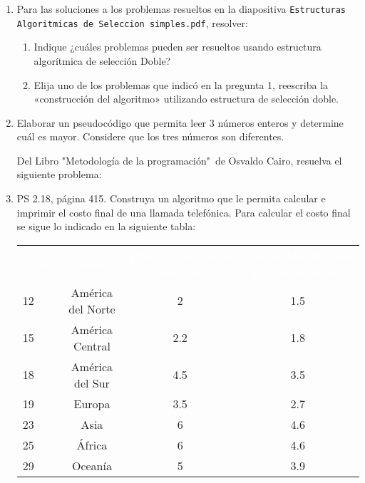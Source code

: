 \documentclass[spanish,11pt,twoside]{article}
\newcommand{\head}[1]{ %
	\textcolor{white}{\textbf{#1}}}
\renewcommand{\arraystretch}{1.5} %
\begin{document}
\begin{enumerate}
	\item Para las soluciones a los problemas resueltos en la diapositiva \texttt{Estructuras Algoritmicas de Seleccion simples.pdf}, resolver:
	\begin{enumerate}
		\item Indique ¿cuáles problemas pueden ser resueltos usando estructura algorítmica de selección Doble?
		\item Elija uno de los problemas que indicó en la pregunta 1, reescriba la «construcción del algoritmo» utilizando estructura de selección doble.
	\end{enumerate}
	

	\item Elaborar un pseudocódigo que permita leer 3 números enteros y determine cuál es mayor. Considere que los tres números son diferentes.	
	
	
	\vspace{24pt}

	Del Libro "Metodología de la programación"\ de Osvaldo Cairo, resuelva el siguiente
	problema:
	
	
	
	\item PS 2.18, página 415. Construya un algoritmo que le permita calcular e imprimir el costo final de una llamada telefónica. Para calcular el costo final se sigue lo indicado en la siguiente tabla:
	
	\begin{table}[H]%
		\renewcommand{\arraystretch}{1.5} %
		\centering\footnotesize%
		\sffamily%
		
		\label{table:problemas:llamada}
		\begin{tabular}{lccc}
			\rowcolor{uasblue}%
			\head{Clave}& \head{Zona} 		& \head{Precio/Minuto (3 primeros)} & \head{Precio/Minuto (del 4to en adelante)}\\
			12 			& América del Norte	& 2									& 1.5 \\
			15			& América Central	& 2.2								& 1.8 \\
			18			& América del Sur	& 4.5								& 3.5 \\
			19			& Europa			& 3.5								& 2.7 \\
			23			& Asia				& 6									& 4.6 \\
			25			& África			& 6									& 4.6 \\
			29			& Oceanía			& 5									& 3.9 \\
		\end{tabular}
	\end{table}
	
\end{enumerate}
\end{document}
